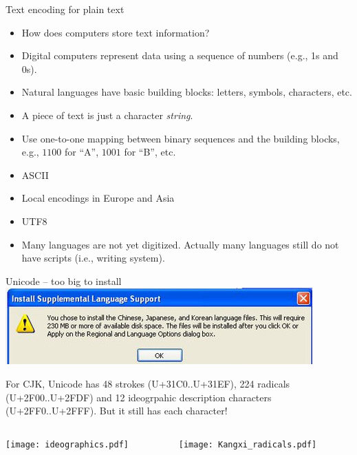 \documentclass[11pt, handout]{beamer}
\begin{document}
\begin{frame}{Text encoding for plain text}
 \begin{itemize}[<+->]
  \item How does computers store text information? 
  \item Digital computers represent data using a sequence of numbers (e.g., 1s and 0s). 
  \item Natural languages have basic building blocks: letters, symbols, characters, etc. 
  \item A piece of text is just a character \emph{string}.
  \item Use one-to-one mapping between binary sequences and the building blocks, e.g., $1100$ for ``A'', $1001$ for ``B'', etc. 
  \item ASCII
  \item Local encodings in Europe and Asia
  \item UTF8
  \item Many languages are not yet digitized. Actually many languages still do not have scripts (i.e., writing system). 
 \end{itemize}
\end{frame}

\begin{frame}{Unicode -- too big to install}
\centering
\includegraphics[width=.6\textwidth]{Windows_XP_CJK.jpg}

For CJK, Unicode has 48 strokes (U+31C0..U+31EF), 224 radicals (U+2F00..U+2FDF) and 12 ideogrpahic description characters (U+2FF0..U+2FFF). But it still has each character! 

\begin{columns}[c]
  \begin{column}{.5\textwidth}
  \texttt{[image: ideographics.pdf]}
  \end{column}
\begin{column}{.5\textwidth}
  \texttt{[image: Kangxi\_radicals.pdf]}
\end{column}
\end{columns}
\end{frame}
\end{document}
